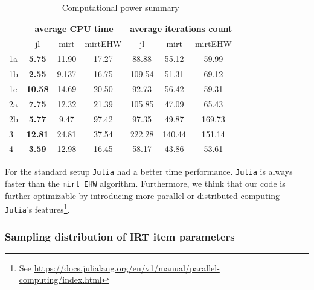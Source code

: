 \begin{table}[h]
	\label{tab:cases}
	\renewcommand{\arraystretch}{1.5}%
	\centering
	\caption{Computational power summary}
	\begin{tabular}{ l  c c  c  c c c  }
		& \multicolumn{3}{c}{average CPU time} & \multicolumn{3}{c}{average iterations count} \\
		\toprule
		& {jl} &{mirt} & {mirt\tiny{EHW}} & {jl} &{mirt} & {mirt\tiny{EHW}}  \\
		\midrule
		1a    &\textbf{5.75} & 11.90 &17.27 &88.88 & 55.12  & 59.99  \\%
		1b    &\textbf{2.55}  & 9.137 &16.75 & 109.54  &51.31 & 69.12 \\%
		1c    &\textbf{10.58}  &14.69  & 20.50 & 92.73 &56.42 & 59.31\\%
		2a    & \textbf{7.75}  &12.32 & 21.39 &105.85  & 47.09 & 65.43 \\%
		2b    &\textbf{5.77}  & 9.47 & 97.42 & 97.35 & 49.87 & 169.73\\%
		3    & \textbf{12.81} & 24.81 &37.54 & 222.28  & 140.44 & 151.14\\%
		4    & \textbf{3.59} & 12.98  &16.45  &58.17  &43.86  &53.61 \\%
		\bottomrule   
		
	\end{tabular}
	
\end{table}


For the standard setup \texttt{Julia} had a better time performance.
\texttt{Julia} is always faster than the \texttt{mirt EHW} algorithm.
Furthermore, we think that our code is further optimizable by introducing more parallel or distributed computing \texttt{Julia}'s features\footnote{See \url{https://docs.julialang.org/en/v1/manual/parallel-computing/index.html}}.


\subsubsection{Sampling distribution of IRT item parameters}


